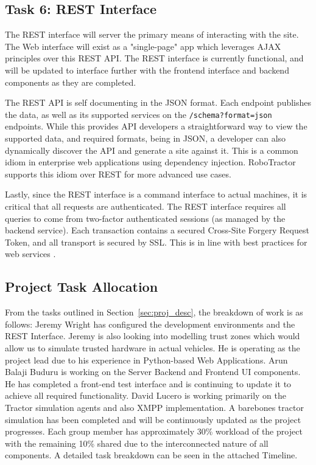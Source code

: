 \documentclass[conference,12pt]{IEEEtran}
\begin{document}
\subsection{Task 6: REST Interface}
The REST interface will server the primary means of interacting with the site.
The Web interface will exist as a "single-page" app which leverages AJAX
principles over this REST API. The REST interface is currently functional, and
will be updated to interface further with the frontend interface and backend
components as they are completed.

The REST API is self documenting in the JSON format. Each endpoint publishes the
data, as well as its supported services on the \texttt{/schema?format=json}
endpoints. While this provides API developers a straightforward way to view the
supported data, and required formats, being in JSON, a developer can also
dynamically discover the API and generate a site against it.  This is a common
idiom in enterprise web applications using dependency injection.  RoboTractor
supports this idiom over REST for more advanced use cases.

Lastly, since the REST interface is a command interface to actual machines, it
is critical that all requests are authenticated. The REST interface requires all
queries to come from two-factor authenticated sessions (as managed by the
backend service).  Each transaction contains a secured Cross-Site Forgery
Request Token, and all transport is secured by SSL. This is in line with best
practices for web services \autocite{ibm_best_2002}.

\subsection{Project Task Allocation}

From the tasks outlined in Section~\ref{sec:proj_desc}, the breakdown of work is as follows:
Jeremy Wright has configured the development environments and the REST
Interface. Jeremy is also looking into modelling trust zones which would allow
us to simulate trusted hardware in actual vehicles.  He is operating as the
project lead due to his experience in Python-based Web Applications.  Arun
Balaji Buduru is working on the Server Backend and Frontend UI components. He
has completed a front-end test interface and is continuing to update it to
achieve all required functionality.  David Lucero is working primarily on the
Tractor simulation agents and also XMPP implementation. A barebones tractor
simulation has been completed and will be continuously updated as the project
progresses.  Each group member has approximately 30\% workload of the project
with the remaining 10\% shared due to the interconnected nature of all
components. A detailed task breakdown can be seen in the attached Timeline.
\end{document}
